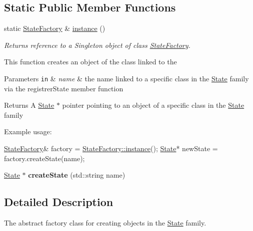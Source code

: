 \subsection*{Static Public Member Functions}
\begin{DoxyCompactItemize}
\item 
static \hyperlink{classStateFactory}{State\-Factory} \& \hyperlink{classStateFactory_aab530d852a1024f169a019cc4fb14f93}{instance} ()
\begin{DoxyCompactList}\small\item\em Returns reference to a Singleton object of class \hyperlink{classStateFactory}{State\-Factory}. \end{DoxyCompactList}\end{DoxyCompactItemize}
\label{_amgrp01747264fe7bf50731df0522c351974e}%
This function creates an object of the class linked to the


\begin{DoxyParams}[1]{Parameters}
\mbox{\tt in}  & {\em name} & the name linked to a specific class in the \hyperlink{classState}{State} family via the registrer\-State member function\\
\hline
\end{DoxyParams}
\begin{DoxyReturn}{Returns}
A \hyperlink{classState}{State} $\ast$ pointer pointing to an object of a specific class in the \hyperlink{classState}{State} family
\end{DoxyReturn}
Example usage\-: 
\begin{DoxyCode}
\hyperlink{classStateFactory}{StateFactory}& factory = \hyperlink{classStateFactory_aab530d852a1024f169a019cc4fb14f93}{StateFactory::instance}();
\hyperlink{classState}{State}* newState = factory.createState(name);
\end{DoxyCode}
 \begin{DoxyCompactItemize}
\item 
\hypertarget{classStateFactory_a01ea8b0749a77f51e0c17d7a50be5cca}{\hyperlink{classState}{State} $\ast$ {\bfseries create\-State} (std\-::string name)}\label{classStateFactory_a01ea8b0749a77f51e0c17d7a50be5cca}

\end{DoxyCompactItemize}


\subsection{Detailed Description}
The abstract factory class for creating objects in the \hyperlink{classState}{State} family. 

